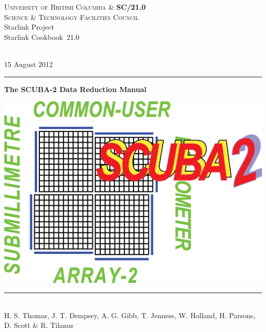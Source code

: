 \documentclass[twoside,11pt]{article}
\newcommand{\stardoccategory}  {Starlink Cookbook}
\newcommand{\stardocinitials}  {SC}
\newcommand{\stardocnumber}    {21.0}
\newcommand{\stardocauthors}   {H. S. Thomas, J. T. Dempsey, A. G. Gibb, T. Jenness, W. Holland, H. Parsons, D. Scott \& R. Tilanus}
\newcommand{\stardoceditor}   {Editor: H. S. Thomas}
\newcommand{\stardocdate}      {15 August 2012}
\newcommand{\stardoctitle}     {The SCUBA-2 Data Reduction Manual}
\newcommand{\stardocname}{\stardocinitials /\stardocnumber}
\newenvironment{latexonly}{}{}
\renewcommand{\_}{\texttt{\symbol{95}}}
\begin{document}
\thispagestyle{empty}

\begin{latexonly}
   \textsc{University of British Columbia \&} \hfill \textbf{\stardocname}\\
   {\textsc{Science \& Technology Facilities Council}}\\
   {\large Starlink Project\\}
   {\large \stardoccategory\ \stardocnumber\\}\\
   \begin{flushright}
 \vspace{-4mm}
   \stardocdate\\
   \end{flushright}
   \vspace{-4mm}
   \rule{\textwidth}{0.5mm}
   \vspace{5mm}
   \begin{center}
   {\Huge\textbf{\stardoctitle \\ [2.5ex]}}
 \vspace{5mm}
\begin{center}
\includegraphics[scale=0.4]{s2logo}
\end{center}
 \vspace{5mm}
   \rule{\textwidth}{0.5mm}\\
   \vspace{5mm}
   \stardocauthors\\
  \vspace{10mm}
   \end{center}
   \vspace{5mm}


\end{latexonly}
\end{document}
